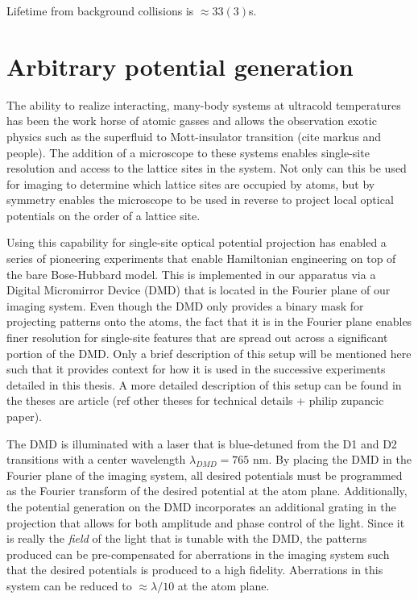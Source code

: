 Lifetime from background collisions is $\approx 33(3)$s. 


\section{Arbitrary potential generation}

The ability to realize interacting, many-body systems at ultracold temperatures has been the work horse of atomic gasses and allows the observation exotic physics such as the superfluid to Mott-insulator transition (cite markus and people). The addition of a microscope to these systems enables single-site resolution and access to the lattice sites in the system. Not only can this be used for imaging to determine which lattice sites are occupied by atoms, but by symmetry enables the microscope to be used in reverse to project local optical potentials on the order of a lattice site.

Using this capability for single-site optical potential projection has enabled a series of pioneering experiments that enable Hamiltonian engineering on top of the bare Bose-Hubbard model. This is implemented in our apparatus via a Digital Micromirror Device (DMD) that is located in the Fourier plane of our imaging system. Even though the DMD only provides a binary mask for projecting patterns onto the atoms, the fact that it is in the Fourier plane enables finer resolution for single-site features that are spread out across a significant portion of the DMD. Only a brief description of this setup will be mentioned here such that it provides context for how it is used in the successive experiments detailed in this thesis. A more detailed description of this setup can be found in the theses are article (ref other theses for technical details + philip zupancic paper).

The DMD is illuminated with a laser that is blue-detuned from the D1 and D2 transitions with a center wavelength $\lambda_{DMD} = 765$ nm. By placing the DMD in the Fourier plane of the imaging system, all desired potentials must be programmed as the Fourier transform of the desired potential at the atom plane. Additionally, the potential generation on the DMD incorporates an additional grating in the projection that allows for both amplitude and phase control of the light. Since it is really the \emph{field} of the light that is tunable with the DMD, the patterns produced can be pre-compensated for aberrations in the imaging system such that the desired potentials is produced to a high fidelity. Aberrations in this system can be reduced to $\approx \lambda/10$ at the atom plane.

